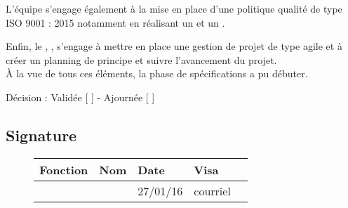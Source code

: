 \documentclass[asi, sansVersion]{picINSA}
\begin{document}
L'équipe \nomEquipe{} s'engage également à la mise en place d'une politique qualité de type ISO 9001 : 2015 notamment en réalisant un \PQ{} et un \PGC{}.

Enfin, le \CP{}, \Sergi{}, s'engage à mettre en place une gestion de projet de type agile et à créer un planning de principe et suivre l'avancement du projet. \\


À la vue de tous ces éléments, la phase de spécifications a pu débuter.

\begin{center}
Décision : Validée [ \checkmark{} ] - Ajournée [ ]
\end{center}

\subsection*{Signature}
\begin{figure}[H]
		\centering
		\begin{tabularx}{17cm}{|p{4cm}|X|X|X|X|}
		\hline
		\rowcolor[gray]{0.85} Fonction & Nom & Date & Visa \\
		\hline
		\CP{} & \Sergi{} & 27/01/16 & courriel\\
		\hline
		\end{tabularx}
\end{figure}
\end{document}
